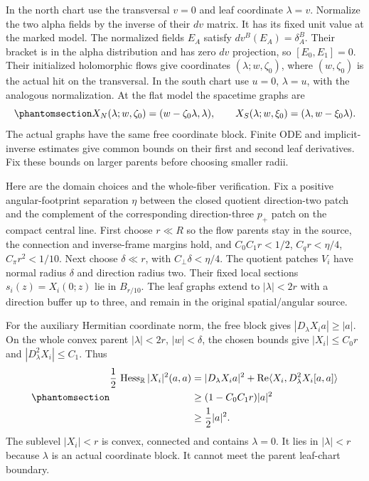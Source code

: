 \documentclass[
  english,
  11pt,
  reqno]{amsart}
\begin{document}
In the north chart use the transversal \(v=0\) and leaf coordinate
\(\lambda=v\). Normalize the two alpha fields by the inverse of their
\(dv\) matrix. It has its fixed unit value at the marked model. The
normalized fields \(E_A\) satisfy \(dv^B(E_A)=\delta_A^B\). Their
bracket is in the alpha distribution and has zero \(dv\) projection, so
\([E_0,E_1]=0\). Their initialized holomorphic flows give coordinates
\((\lambda;w,\zeta_0)\), where \((w,\zeta_0)\) is the actual hit on the
transversal. In the south chart use \(u=0\), \(\lambda=u\), with the
analogous normalization. At the flat model the spacetime graphs are
\begin{equation}\protect\phantomsection\label{eq:gg-penrose-flat-leaf-graphs}{
 X_N(\lambda;w,\zeta_0)=(w-\zeta_0\lambda,\lambda),\qquad
 X_S(\lambda;w,\xi_0)=(\lambda,w-\xi_0\lambda).
}\end{equation} The actual graphs have the same free coordinate block.
Finite ODE and implicit-inverse estimates give common bounds on their
first and second leaf derivatives. Fix these bounds on larger parents
before choosing smaller radii.

Here are the domain choices and the whole-fiber verification. Fix a
positive angular-footprint separation \(\eta\) between the closed
quotient direction-two patch and the complement of the corresponding
direction-three \(p_+\) patch on the compact central line. First choose
\(r\ll R\) so the flow parents stay in the source, the connection and
inverse-frame margins hold, and \(C_0C_1r<1/2\), \(C_qr<\eta/4\),
\(C_\pi r^2<1/10\). Next choose \(\delta\ll r\), with
\(C_\perp\delta<\eta/4\). The quotient patches \(V_i\) have normal
radius \(\delta\) and direction radius two. Their fixed local sections
\(s_i(z)=X_i(0;z)\) lie in \(B_{r/10}\). The leaf graphs extend to
\(|\lambda|<2r\) with a direction buffer up to three, and remain in the
original spatial/angular source.

For the auxiliary Hermitian coordinate norm, the free block gives
\(|D_\lambda X_i a|\ge|a|\). On the whole convex parent
\(|\lambda|<2r\), \(|w|<\delta\), the chosen bounds give
\(|X_i|\le C_0r\) and \(|D_\lambda^2X_i|\le C_1\). Thus
\begin{equation}\protect\phantomsection\label{eq:gg-penrose-whole-parent-convexity}{\begin{aligned}
\frac12\,\operatorname{Hess}_{\mathbb R}|X_i|^2(a,a)&=|D_\lambda X_i a|^2+
       \operatorname{Re}\langle X_i,D_\lambda^2X_i[a,a]\rangle \\
&\ge(1-C_0C_1r)|a|^2 \\
&\ge\frac12|a|^2 .
\end{aligned}}\end{equation} The sublevel \(|X_i|<r\) is convex, connected and
contains \(\lambda=0\). It lies in \(|\lambda|<r\) because \(\lambda\)
is an actual coordinate block. It cannot meet the parent leaf-chart
boundary.
\end{document}
